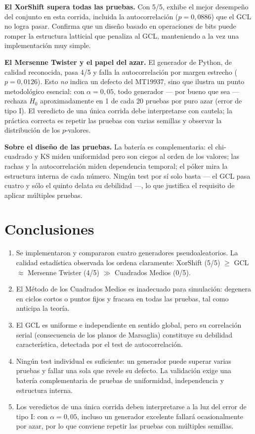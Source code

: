 \documentclass[11pt]{article}
\begin{document}
\textbf{El XorShift supera todas las pruebas.} Con 5/5, exhibe el mejor
desempe\~no del conjunto en esta corrida, incluida la autocorrelaci\'on
($p = 0{,}0886$) que el GCL no logra pasar. Confirma que un dise\~no
basado en operaciones de bits puede romper la estructura latticial que
penaliza al GCL, manteniendo a la vez una implementaci\'on muy simple.

\textbf{El Mersenne Twister y el papel del azar.} El generador de Python,
de calidad reconocida, pasa 4/5 y falla la autocorrelaci\'on por margen
estrecho ($p = 0{,}0126$). Esto \emph{no} indica un defecto del MT19937,
sino que ilustra un punto metodol\'ogico esencial: con $\alpha = 0{,}05$,
todo generador --- por bueno que sea --- rechaza $H_0$ aproximadamente
en 1 de cada 20 pruebas por puro azar (error de tipo I). El veredicto de
una \'unica corrida debe interpretarse con cautela; la pr\'actica correcta
es repetir las pruebas con varias semillas y observar la distribuci\'on de
los $p$-valores.

\textbf{Sobre el dise\~no de las pruebas.} La bater\'ia es complementaria:
el chi-cuadrado y KS miden uniformidad pero son ciegos al orden de los
valores; las rachas y la autocorrelaci\'on miden dependencia temporal; el
p\'oker mira la estructura interna de cada n\'umero. Ning\'un test por
s\'i solo basta --- el GCL pasa cuatro y s\'olo el quinto delata su
debilidad ---, lo que justifica el requisito de aplicar m\'ultiples
pruebas.

\section{Conclusiones}

\begin{enumerate}
  \item Se implementaron y compararon cuatro generadores
    pseudoaleatorios. La calidad estad\'istica observada los ordena
    claramente: XorShift (5/5) $\ge$ GCL $\approx$ Mersenne Twister (4/5)
    $\gg$ Cuadrados Medios (0/5).
  \item El M\'etodo de los Cuadrados Medios es inadecuado para
    simulaci\'on: degenera en ciclos cortos o puntos fijos y fracasa en
    todas las pruebas, tal como anticipa la teor\'ia.
  \item El GCL es uniforme e independiente en sentido global, pero su
    correlaci\'on serial (consecuencia de los planos de Marsaglia)
    constituye su debilidad caracter\'istica, detectada por el test de
    autocorrelaci\'on.
  \item Ning\'un test individual es suficiente: un generador puede superar
    varias pruebas y fallar una sola que revele su defecto. La validaci\'on
    exige una bater\'ia complementaria de pruebas de uniformidad,
    independencia y estructura interna.
  \item Los veredictos de una \'unica corrida deben interpretarse a la luz
    del error de tipo I: con $\alpha = 0{,}05$, incluso un generador
    excelente fallar\'a ocasionalmente por azar, por lo que conviene
    repetir las pruebas con m\'ultiples semillas.
\end{enumerate}
\end{document}
